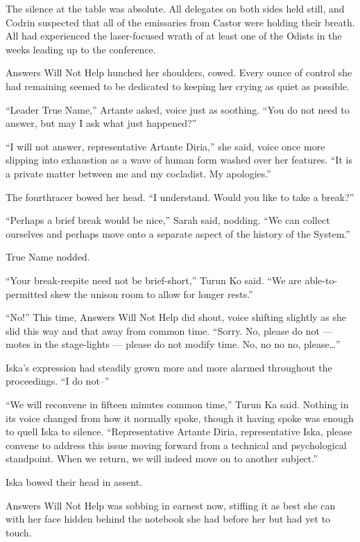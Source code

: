 The silence at the table was absolute. All delegates on both sides held still, and Codrin suspected that all of the emissaries from Castor were holding their breath. All had experienced the laser-focused wrath of at least one of the Odists in the weeks leading up to the conference.

Answers Will Not Help hunched her shoulders, cowed. Every ounce of control she had remaining seemed to be dedicated to keeping her crying as quiet as possible.

``Leader True Name,'' Artante asked, voice just as soothing. ``You do not need to answer, but may I ask what just happened?''

``I will not answer, representative Artante Diria,'' she said, voice once more slipping into exhaustion as a wave of human form washed over her features. ``It is a private matter between me and my cocladist. My apologies.''

The fourthracer bowed her head. ``I understand. Would you like to take a break?''

``Perhaps a brief break would be nice,'' Sarah said, nodding. ``We can collect ourselves and perhaps move onto a separate aspect of the history of the System.''

True Name nodded.

``Your break-respite need not be brief-short,'' Turun Ko said. ``We are able-to-permitted skew the unison room to allow for longer rests.''

``No!'' This time, Answers Will Not Help did shout, voice shifting slightly as she slid this way and that away from common time. ``Sorry. No, please do not — motes in the stage-lights — please do not modify time. No, no no no, please\ldots{}''

Iska's expression had steadily grown more and more alarmed throughout the proceedings. ``I do not--''

``We will reconvene in fifteen minutes common time,'' Turun Ka said. Nothing in its voice changed from how it normally spoke, though it having spoke was enough to quell Iska to silence. ``Representative Artante Diria, representative Iska, please convene to address this issue moving forward from a technical and psychological standpoint. When we return, we will indeed move on to another subject.''

Iska bowed their head in assent.

Answers Will Not Help was sobbing in earnest now, stifling it as best she can with her face hidden behind the notebook she had before her but had yet to touch.

